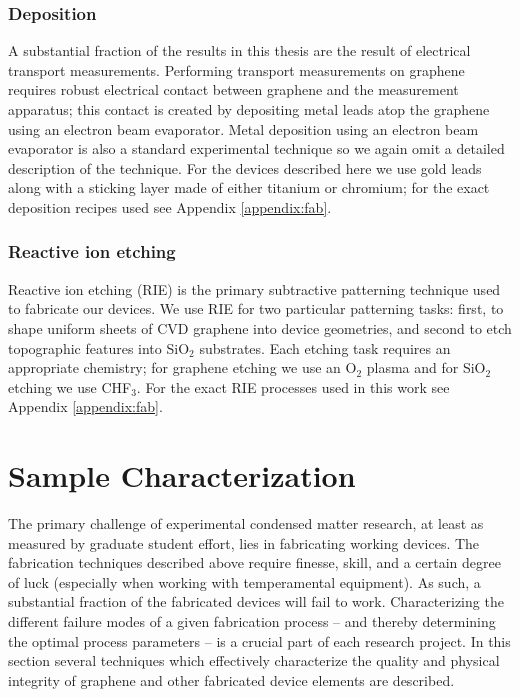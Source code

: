 \documentclass[edeposit,fullpage,draftthesis]{uiucthesis2009}
\begin{document}
            \subsubsection{Deposition}
            
            A substantial fraction of the results in this thesis are the result of electrical transport measurements.
            Performing transport measurements on graphene requires robust electrical contact between
            graphene and the measurement apparatus; this contact is created by depositing
            metal leads atop the graphene using an electron beam evaporator. 
            Metal deposition using an electron beam evaporator is also a standard experimental technique
            so we again omit a detailed description of the technique.
            For the devices described here we use gold leads along with a sticking layer made of either
            titanium or chromium; for the exact deposition recipes used see Appendix \ref{appendix:fab}.
            
            \subsubsection{Reactive ion etching}
            
            Reactive ion etching (RIE) is the primary subtractive patterning technique used 
            to fabricate our devices. We use RIE for two particular patterning tasks: first, to 
            shape uniform sheets of CVD graphene into device geometries, and second to etch
            topographic features into SiO$_2$ substrates. 
            Each etching task requires an appropriate chemistry; for graphene etching we use
            an O$_2$ plasma and for SiO$_2$ etching we use CHF$_3$.
            For the exact RIE processes used in this work see Appendix \ref{appendix:fab}.
    
    \section{Sample Characterization}
    
    The primary challenge of experimental condensed matter research, at least as measured by graduate student effort, lies in fabricating working devices. The fabrication techniques described above require finesse, skill, and a certain degree of luck (especially when working with temperamental equipment). As such, a substantial fraction of the fabricated devices will fail to work. Characterizing the different failure modes of a given fabrication process -- and thereby determining the optimal process parameters -- is a crucial part of each research project. In this section several techniques which effectively characterize the quality and physical integrity of graphene and other fabricated device elements are described.
    
\end{document}
